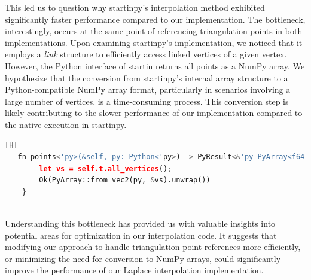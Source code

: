 \documentclass{article}
\begin{document}
\noindent This led us to question why startinpy’s interpolation method exhibited significantly faster performance compared to our implementation. The bottleneck, interestingly, occurs at the same point of referencing triangulation points in both implementations. Upon examining startinpy’s implementation, we noticed that it employs a \textit{link} structure to efficiently access linked vertices of a given vertex. However, the Python interface of startin returns all points as a NumPy array. We hypothesize that the conversion from startinpy’s internal array structure to a Python-compatible NumPy array format, particularly in scenarios involving a large number of vertices, is a time-consuming process. This conversion step is likely contributing to the slower performance of our implementation compared to the native execution in startinpy.\\



\begin{lstlisting}[language=Python, caption={\protect\href{https://github.com/hugoledoux/startinpy/blob/d99e96c7818b9003801db48085b46e54c0db03a0/src/lib.rs#L73C1-L76C6}{Code to Convert startin Data Structure to Python Data Structure}}, label={code2}][H]
   fn points<'py>(&self, py: Python<'py>) -> PyResult<&'py PyArray<f64, numpy::Ix2>> {
        let vs = self.t.all_vertices();
        Ok(PyArray::from_vec2(py, &vs).unwrap())
    }
    
\end{lstlisting}

\noindent Understanding this bottleneck has provided us with valuable insights into potential areas for optimization in our interpolation code. It suggests that modifying our approach to handle triangulation point references more efficiently, or minimizing the need for conversion to NumPy arrays, could significantly improve the performance of our Laplace interpolation implementation.\\
\end{document}
